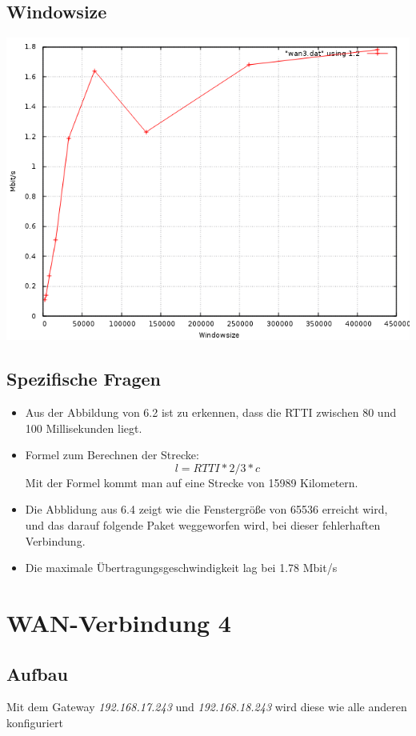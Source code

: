 \documentclass[a4paper,10pt]{article}
\begin{document}
\subsection{Windowsize}
\includegraphics[scale=0.75]{wan3_windows.png}

\subsection{Spezifische Fragen}
\begin{itemize}
 \item Aus der Abbildung von 6.2 ist zu erkennen, dass die RTTI zwischen 80 und 100 Millisekunden liegt.
 \item Formel zum Berechnen der Strecke: 
 \begin{equation}
  l=RTTI*2/3*c
 \end{equation}
 Mit der Formel kommt man auf eine Strecke von 15989 Kilometern.
 \item Die Abblidung aus  6.4 zeigt wie die Fenstergröße von 65536 erreicht wird, und das darauf folgende Paket
 weggeworfen wird, bei dieser fehlerhaften Verbindung.
 \item Die maximale Übertragungsgeschwindigkeit lag bei 1.78 Mbit/s
\end{itemize}

\section{WAN-Verbindung 4}

\subsection{Aufbau}
Mit dem Gateway \textit{192.168.17.243} und \textit{192.168.18.243} wird diese wie alle anderen konfiguriert
\end{document}
